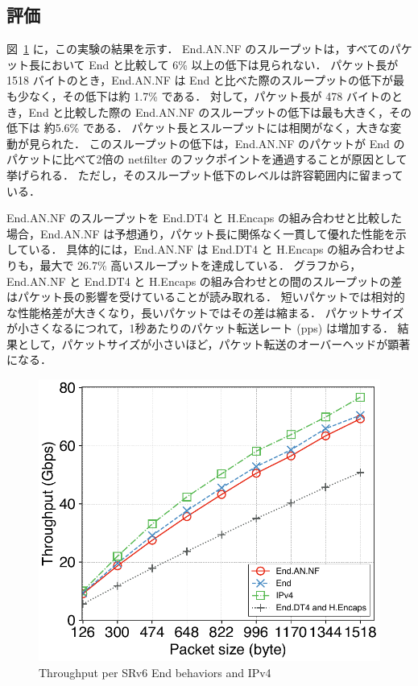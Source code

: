 \subsection{評価}
\label{ssec:thru-size.eval}
図~\ref{fig:size-thru} に，この実験の結果を示す．
End.AN.NF のスループットは，すべてのパケット長において End と比較して 6\% 以上の低下は見られない．
パケット長が 1518 バイトのとき，End.AN.NF は End と比べた際のスループットの低下が最も少なく，その低下は約 1.7\% である．
対して，パケット長が 478 バイトのとき，End と比較した際の End.AN.NF のスループットの低下は最も大きく，その低下は 約5.6\% である．
パケット長とスループットには相関がなく，大きな変動が見られた．
このスループットの低下は，End.AN.NF のパケットが End のパケットに比べて2倍の netfilter のフックポイントを通過することが原因として挙げられる．
ただし，そのスループット低下のレベルは許容範囲内に留まっている．

End.AN.NF のスループットを End.DT4 と H.Encaps の組み合わせと比較した場合，End.AN.NF は予想通り，パケット長に関係なく一貫して優れた性能を示している．
具体的には，End.AN.NF は End.DT4 と H.Encaps の組み合わせよりも，最大で 26.7\% 高いスループットを達成している．
グラフから，End.AN.NF と End.DT4 と H.Encaps の組み合わせとの間のスループットの差はパケット長の影響を受けていることが読み取れる．
短いパケットでは相対的な性能格差が大きくなり，長いパケットではその差は縮まる．
パケットサイズが小さくなるにつれて，1秒あたりのパケット転送レート (pps) は増加する．
結果として，パケットサイズが小さいほど，パケット転送のオーバーヘッドが顕著になる．

\begin{figure}[t]
    \centering
    \includegraphics[width=0.95\linewidth]{img/size-throughput.pdf}
    \caption{Throughput per SRv6 End behaviors and IPv4}
    \label{fig:size-thru}
\end{figure}



